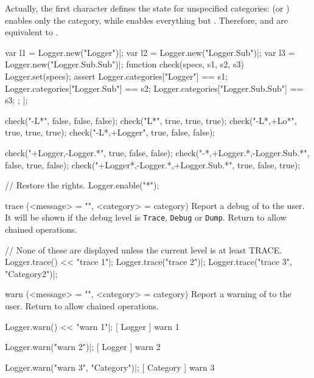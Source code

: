 \begin{urbiscriptapi}
  Actually, the first character defines the state for unspecified
  categories:  (or ) enables only the 
  category, while  enables everything but .
  Therefore,  and  are
  equivalent to .

\begin{urbiunchecked}
var l1 = Logger.new("Logger")|;
var l2 = Logger.new("Logger.Sub")|;
var l3 = Logger.new("Logger.Sub.Sub")|;
function check(specs, s1, s2, s3)
{
  Logger.set(specs);
  assert
  {
    Logger.categories["Logger"]         == s1;
    Logger.categories["Logger.Sub"]     == s2;
    Logger.categories["Logger.Sub.Sub"] == s3;
  };
}|;

check("-L*",      false, false, false);
check("L*",       true, true, true);
check("-L*,+Lo*", true, true, true);
check("-L*,+Logger", true, false, false);

check("+Logger,-Logger.*", true, false, false);
check("-*,+Logger.*,-Logger.Sub.*", false, true, false);
check("+Logger*,-Logger.*,+Logger.Sub.*", true, false, true);
\end{urbiunchecked}

\begin{urbicomment}
// Restore the rights.
Logger.enable("*");
\end{urbicomment}


\item[trace](<message> = "", <category> = category)%
  Report a debug  of  to the user. It will be
  shown if the debug level is \lstinline|Trace|, \lstinline|Debug| or
  \lstinline|Dump|. Return \this to allow chained operations.
\begin{urbiunchecked}
// None of these are displayed unless the current level is at least TRACE.
Logger.trace() << "trace 1"|;
Logger.trace("trace 2")|;
Logger.trace("trace 3", "Category2")|;
\end{urbiunchecked}


\item[warn](<message> = "", <category> = category)%
  Report a warning  of  to the user. Return \this
  to allow chained operations.
\begin{urbiunchecked}
Logger.warn() << "warn 1"|;
[       Logger        ] warn 1

Logger.warn("warn 2")|;
[       Logger        ] warn 2

Logger.warn("warn 3", "Category")|;
[       Category       ] warn 3
\end{urbiunchecked}
\end{urbiscriptapi}

